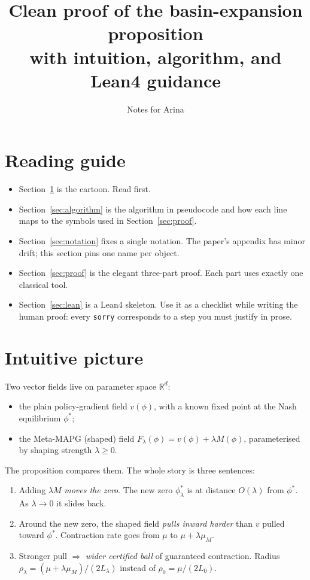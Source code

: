 \documentclass[11pt]{article}
\title{Clean proof of the basin-expansion proposition\\
       \large with intuition, algorithm, and Lean4 guidance}
\author{Notes for Arina}
\date{}
\newcommand{\R}{\mathbb{R}}
\begin{document}
\maketitle

\section*{Reading guide}

\begin{itemize}[leftmargin=*]
\item Section~\ref{sec:intuition} is the cartoon. Read first.
\item Section~\ref{sec:algorithm} is the algorithm in pseudocode and how each line maps to the symbols used in Section~\ref{sec:proof}.
\item Section~\ref{sec:notation} fixes a single notation. The paper's appendix has minor drift; this section pins one name per object.
\item Section~\ref{sec:proof} is the elegant three-part proof. Each part uses exactly one classical tool.
\item Section~\ref{sec:lean} is a Lean4 skeleton. Use it as a checklist while writing the human proof: every \texttt{sorry} corresponds to a step you must justify in prose.
\end{itemize}

\section{Intuitive picture}\label{sec:intuition}

Two vector fields live on parameter space $\R^d$:

\begin{itemize}
\item the plain policy-gradient field $v(\phi)$, with a known fixed point at the Nash equilibrium $\phi^*$;
\item the Meta-MAPG (shaped) field $F_\lambda(\phi) = v(\phi) + \lambda M(\phi)$, parameterised by shaping strength $\lambda \ge 0$.
\end{itemize}

The proposition compares them. The whole story is three sentences:

\begin{enumerate}[label=(\roman*)]
\item Adding $\lambda M$ \emph{moves the zero}. The new zero $\phi^*_\lambda$ is at distance $O(\lambda)$ from $\phi^*$. As $\lambda \to 0$ it slides back.
\item Around the new zero, the shaped field \emph{pulls inward harder} than $v$ pulled toward $\phi^*$. Contraction rate goes from $\mu$ to $\mu + \lambda \mu_M$.
\item Stronger pull $\Rightarrow$ \emph{wider certified ball} of guaranteed contraction. Radius $\rho_\lambda = (\mu + \lambda \mu_M)/(2L_\lambda)$ instead of $\rho_0 = \mu/(2L_0)$.
\end{enumerate}
\end{document}
